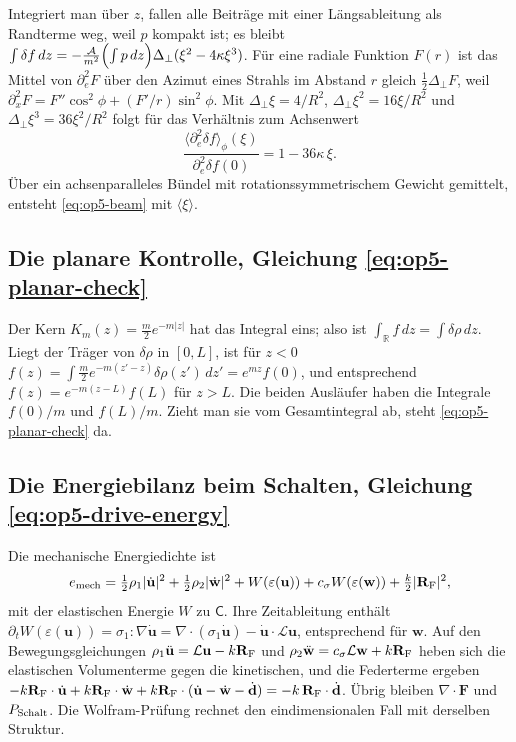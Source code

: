 Integriert man über \(z\), fallen alle Beiträge mit einer Längsableitung als Randterme weg, weil \(p\) kompakt ist; es bleibt
\(\int\delta f\,dz=-\tfrac{\mathcal A}{m^2}\Bigl(\int p\,dz\Bigr)\Delta_\perp(\xi^2-4\kappa\xi^3)\). Für eine radiale Funktion \(F(r)\) ist das Mittel
von \(\partial_e^2F\) über den Azimut eines Strahls im Abstand \(r\) gleich \(\tfrac12\Delta_\perp F\), weil
\(\partial_x^2F=F''\cos^2\phi+(F'/r)\sin^2\phi\). Mit \(\Delta_\perp\xi=4/R^2\), \(\Delta_\perp\xi^2=16\xi/R^2\) und \(\Delta_\perp\xi^3=36\xi^2/R^2\) folgt
für das Verhältnis zum Achsenwert
\[
 \frac{\langle\partial_e^2\delta f\rangle_\phi(\xi)}{\partial_e^2\delta f(0)}=1-36\kappa\,\xi .
\]
Über ein achsenparalleles Bündel mit rotationssymmetrischem Gewicht gemittelt, entsteht \eqref{eq:op5-beam} mit \(\langle\xi\rangle\).

\subsection{Die planare Kontrolle, Gleichung \eqref{eq:op5-planar-check}}
\label{sec:anhang-b-planar}

Der Kern \(K_m(z)=\tfrac m2e^{-m|z|}\) hat das Integral eins; also ist \(\int_{\mathbb R}f\,dz=\int\delta\rho\,dz\). Liegt der Träger von
\(\delta\rho\) in \([0,L]\), ist für \(z<0\)
\(f(z)=\int\tfrac m2e^{-m(z'-z)}\delta\rho(z')\,dz'=e^{mz}f(0)\), und entsprechend \(f(z)=e^{-m(z-L)}f(L)\) für \(z>L\). Die beiden
Ausläufer haben die Integrale \(f(0)/m\) und \(f(L)/m\). Zieht man sie vom Gesamtintegral ab, steht \eqref{eq:op5-planar-check} da.

\subsection{Die Energiebilanz beim Schalten, Gleichung \eqref{eq:op5-drive-energy}}
\label{sec:anhang-b-energie}

Die mechanische Energiedichte ist
\[
 e_{\rm mech}=\tfrac12\rho_1|\dot{\mathbf u}|^2+\tfrac12\rho_2|\dot{\mathbf w}|^2+W(\varepsilon(\mathbf u))+c_\sigma W(\varepsilon(\mathbf w))
 +\tfrac k2|\mathbf R_{\rm F}|^2 ,
\]
mit der elastischen Energie \(W\) zu \(\mathsf C\). Ihre Zeitableitung enthält \(\partial_tW(\varepsilon(\mathbf u))=\sigma_1:\nabla\dot{\mathbf u}
=\nabla\cdot(\sigma_1\dot{\mathbf u})-\dot{\mathbf u}\cdot\mathcal L\mathbf u\), entsprechend für \(\mathbf w\). Auf den Bewegungsgleichungen
\(\rho_1\ddot{\mathbf u}=\mathcal L\mathbf u-k\mathbf R_{\rm F}\) und \(\rho_2\ddot{\mathbf w}=c_\sigma\mathcal L\mathbf w+k\mathbf R_{\rm F}\) heben sich
die elastischen Volumenterme gegen die kinetischen, und die Federterme ergeben
\(-k\mathbf R_{\rm F}\cdot\dot{\mathbf u}+k\mathbf R_{\rm F}\cdot\dot{\mathbf w}+k\mathbf R_{\rm F}\cdot(\dot{\mathbf u}-\dot{\mathbf w}-\dot{\mathbf d})=-k\,\mathbf R_{\rm F}\cdot\dot{\mathbf d}\).
Übrig bleiben \(\nabla\cdot\mathbf F\) und \(P_{\rm Schalt}\). Die Wolfram-Prüfung rechnet den eindimensionalen Fall mit derselben Struktur.

